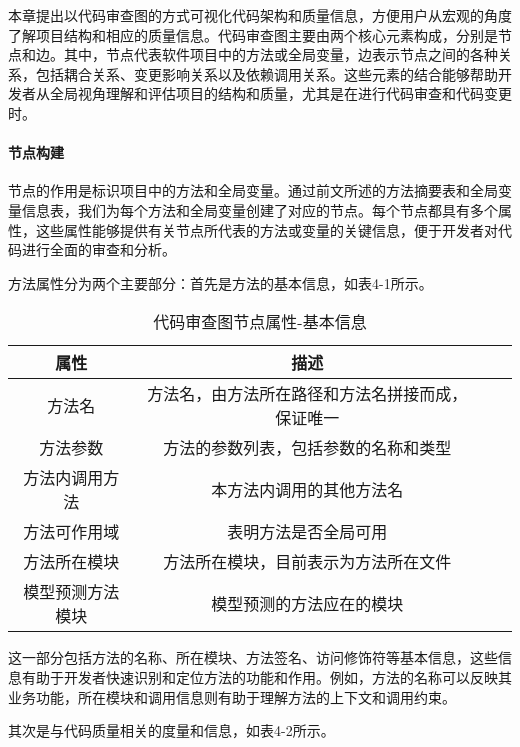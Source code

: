 本章提出以代码审查图的方式可视化代码架构和质量信息，方便用户从宏观的角度了解项目结构和相应的质量信息。代码审查图主要由两个核心元素构成，分别是节点和边。其中，节点代表软件项目中的方法或全局变量，边表示节点之间的各种关系，包括耦合关系、变更影响关系以及依赖调用关系。这些元素的结合能够帮助开发者从全局视角理解和评估项目的结构和质量，尤其是在进行代码审查和代码变更时。

\paragraph{节点构建} 节点的作用是标识项目中的方法和全局变量。通过前文所述的方法摘要表和全局变量信息表，我们为每个方法和全局变量创建了对应的节点。每个节点都具有多个属性，这些属性能够提供有关节点所代表的方法或变量的关键信息，便于开发者对代码进行全面的审查和分析。



方法属性分为两个主要部分：首先是方法的基本信息，如表4-1所示。

\begin{table}[htbp]
\caption{代码审查图节点属性-基本信息}
\vspace{0.5em}\centering\wuhao
\begin{tabular}{cccc}
\toprule
    属性 & 描述 \\
\midrule
方法名 & 方法名，由方法所在路径和方法名拼接而成，保证唯一  \\
方法参数 & 方法的参数列表，包括参数的名称和类型   \\
方法内调用方法 & 本方法内调用的其他方法名   \\
方法可作用域 & 表明方法是否全局可用   \\
方法所在模块 &  方法所在模块，目前表示为方法所在文件  \\
模型预测方法模块 & 模型预测的方法应在的模块   \\     
\bottomrule
\end{tabular}
\end{table}

这一部分包括方法的名称、所在模块、方法签名、访问修饰符等基本信息，这些信息有助于开发者快速识别和定位方法的功能和作用。例如，方法的名称可以反映其业务功能，所在模块和调用信息则有助于理解方法的上下文和调用约束。

其次是与代码质量相关的度量和信息，如表4-2所示。

